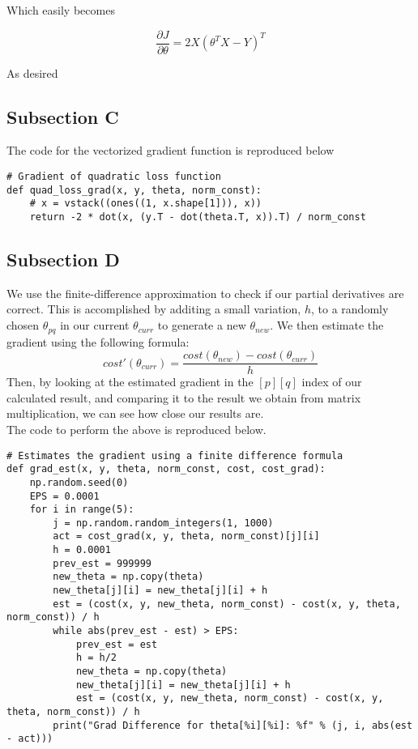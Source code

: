 \documentclass[11pt,a4paper]{report}
\begin{document}
Which easily becomes

\begin{equation}
\frac{\partial J}{\partial \theta} = 2X(\theta^TX-Y)^T
\end{equation}

As desired
\subsection*{Subsection C}
The code for the vectorized gradient function is reproduced below
\begin{lstlisting}
# Gradient of quadratic loss function
def quad_loss_grad(x, y, theta, norm_const):
    # x = vstack((ones((1, x.shape[1])), x))
    return -2 * dot(x, (y.T - dot(theta.T, x)).T) / norm_const
\end{lstlisting}

\subsection*{Subsection D}
We use the finite-difference approximation to check if our partial derivatives are correct. This is accomplished by additing a small variation, $h$, to a randomly chosen $\theta_{pq}$ in our current $\theta_{curr}$ to generate a new $\theta_{new}$. We then estimate the gradient using the following formula:
\begin{equation}
cost'(\theta_{curr}) = \frac{cost(\theta_{new})-cost(\theta_{curr})}{h} 
\end{equation}
Then, by looking at the estimated gradient in the $[p][q]$ index of our calculated result, and comparing it to the result we obtain from matrix multiplication, we can see how close our results are.\\
The code to perform the above is reproduced below.
\begin{lstlisting}
# Estimates the gradient using a finite difference formula
def grad_est(x, y, theta, norm_const, cost, cost_grad):
    np.random.seed(0)
    EPS = 0.0001
    for i in range(5):
        j = np.random.random_integers(1, 1000)
        act = cost_grad(x, y, theta, norm_const)[j][i]
        h = 0.0001
        prev_est = 999999
        new_theta = np.copy(theta)
        new_theta[j][i] = new_theta[j][i] + h
        est = (cost(x, y, new_theta, norm_const) - cost(x, y, theta, norm_const)) / h
        while abs(prev_est - est) > EPS:
            prev_est = est
            h = h/2
            new_theta = np.copy(theta)
            new_theta[j][i] = new_theta[j][i] + h
            est = (cost(x, y, new_theta, norm_const) - cost(x, y, theta, norm_const)) / h
        print("Grad Difference for theta[%i][%i]: %f" % (j, i, abs(est - act)))
\end{lstlisting}
\end{document}
